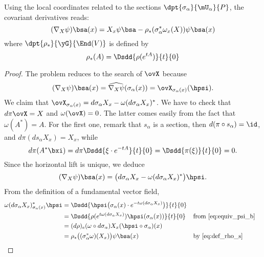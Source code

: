 \begin{theorem}
	Using the local coordinates related to the sections $\dpt{\sigma_{\alpha}}{\mU_{\alpha}}{P}$, the covariant derivatives reads:
	\begin{equation}\label{eq:nabla_coord}
		(\nabla_X\psi)\bsa(x)=X_x\psi\bsa-\rho_*(\sigma_{\alpha}^*\omega_x(X))\psi\bsa(x)
	\end{equation}
	where $\dpt{\rho_*}{\yG}{\End(V)}$ is defined by
	\begin{equation}  \label{eq:def_rho_s}
		\rho_*(A)=\Dsdd{\rho(e^{tA})}{t}{0}
	\end{equation}

\end{theorem}

\begin{proof}
	The problem reduces to the search of $\ovX$ because
	\[
		(\nabla_X\psi)\bsa(x)=\widehat{\nabla_X\psi}(\sigma_{\alpha}(x))=\ovX_{\sigma_{\alpha}(x)}(\hpsi).
	\]
	We claim that $\ovX_{\sigma_{\alpha}(x)}=d\sigma_{\alpha} X_x-\omega(d\sigma_{\alpha} X_x)^*$. We have to check that $d\pi\ovX=X$ and $\omega(\ovX)=0$. The latter comes easily from the fact that $\omega(A^*)=A$. For the first one, remark that $s_{\alpha}$ is a section, then $d(\pi\circ s_{\alpha})=\id$, and $d\pi(ds_{\alpha} X_x)=X_x$, while
	\begin{equation}
		d\pi(A^*\bxi)=d\pi\Dsdd{\xi\cdot e^{-tA}}{t}{0}
		=\Dsdd{\pi(\xi)}{t}{0}
		=0.
	\end{equation}
	Since the horizontal lift is unique, we deduce
	\begin{equation}
		(\nabla_X\psi)\bsa(x)=\big(  d\sigma_{\alpha} X_x-\omega(d\sigma_{\alpha} X_x)^*  \big)\hpsi.
	\end{equation}
	From the definition of a fundamental vector field,
	\begin{equation}
		\begin{aligned}
			\omega(d\sigma_{\alpha} X_x)^*_{\sigma_{\alpha}(x)}\hpsi
			 & =\Dsdd{\hpsi\big(\sigma_{\alpha}(x)\cdot e^{-t\omega(d\sigma_{\alpha} X_x)}  \big) }{t}{0}                                         \\
			 & =\Dsdd{\rho(e^{t\omega(d\sigma_{\alpha} X_x)})\hpsi(\sigma_{\alpha}(x))}{t}{0}             &  & \text{from \eqref{eq:equiv_psi_b}} \\
			 & =(d\rho)_e(\omega\circ d\sigma_{\alpha})X_x(\hpsi\circ\sigma_{\alpha})(x)                                                          \\
			 & =\rho_*\big( (\sigma_{\alpha}^*\omega)(X_x) \big)\psi\bsa(x)                               &  & \text{by \eqref{eq:def_rho_s}}
		\end{aligned}
	\end{equation}

\end{proof}

